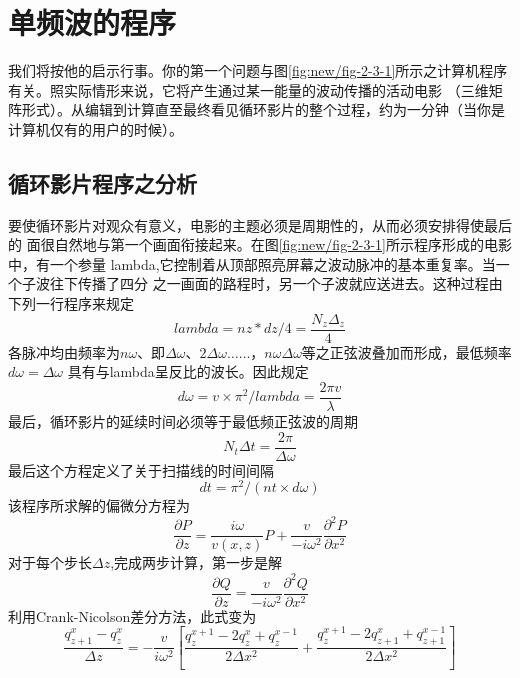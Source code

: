 \section{单频波的程序}
我们将按他的启示行事。你的第一个问题与图\ref{fig:new/fig-2-3-1}所示之计算机程序有关。照实际情形来说，它将产生通过某一能量的波动传播的活动电影
（三维矩阵形式）。从编辑到计算直至最终看见循环影片的整个过程，约为一分钟（当你是计算机仅有的用户的时候）。
\subsection{循环影片程序之分析}
要使循环影片对观众有意义，电影的主题必须是周期性的，从而必须安排得使最后的
面很自然地与第一个画面衔接起来。在图\ref{fig:new/fig-2-3-1}所示程序形成的电影中，有一个参量
lambda,它控制着从顶部照亮屏幕之波动脉冲的基本重复率。当一个子波往下传播了四分
之一画面的路程时，另一个子波就应送进去。这种过程由下列一行程序来规定
\begin{equation*}
lambda=nz*dz/4=\frac{N_z\Delta_z}{4}
\end{equation*}
各脉冲均由频率为$n\omega$、即$\Delta \omega$、$2\Delta\omega\ldots\ldots$，$n\omega\Delta\omega$等之正弦波叠加而形成，最低频率$d\omega=\Delta\omega$
具有与lambda呈反比的波长。因此规定
\begin{equation*}
d\omega=v\times\pi^2/lambda=\frac{2\pi v}{\lambda}
\end{equation*}
最后，循环影片的延续时间必须等于最低频正弦波的周期
\begin{equation*}
N_t\Delta t=\frac{2\pi}{\Delta \omega}
\end{equation*}
最后这个方程定义了关于扫描线的时间间隔
\begin{equation*}
dt=\pi^2/(nt\times d\omega)
\end{equation*}
该程序所求解的偏微分方程为
\begin{equation}
\frac{\partial P}{\partial z}=\frac{i\omega}{v(x,z)}P+\frac{v}{-i\omega^2}\frac{\partial^2 P}{\partial x^2}
\label{eq:ex2.3.1}
\end{equation}
对于每个步长$\Delta z$,完成两步计算，第一步是解
\begin{equation}
\frac{\partial Q}{\partial z}=\frac{v}{-i\omega^2}\frac{\partial^2 Q}{\partial x^2}
\label{eq:ex2.3.2}
\end{equation}
利用Crank-Nicolson差分方法，此式变为
\begin{equation*}
\frac{q_{z+1}^x-q_z^x}{\Delta z}=-\frac{v}{i\omega^2}[\frac{q_z^{x+1}-2q_z^x+q_z^{x-1}}{2\Delta x^2}+
\frac{q_z^{x+1}-2q_{z+1}^x+q_{z+1}^{x-1}}{2\Delta x^2}]
\end{equation*}
